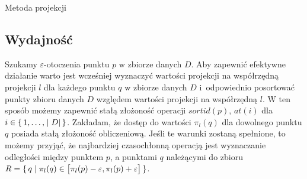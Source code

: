 \begin{algorithm}[t]
	\caption{Metoda projekcji}\label{alg:projection}
	
	\DontPrintSemicolon
	
	
	\setcounter{AlgoLine}{0}
	\nonl{}
	\setcounter{AlgoLine}{0}
	\nonl{}
	
	\setcounter{AlgoLine}{0}
	\nonl{}
	\nonl{}
\end{algorithm}

\subsection{Wydajność}
Szukamy $ \varepsilon $-otoczenia punktu $ p $ w zbiorze danych $ D $. Aby zapewnić efektywne działanie  warto jest wcześniej wyznaczyć wartości projekcji na współrzędną projekcji $ l $ dla każdego punktu $ q $ w zbiorze danych $ D $ \mbox{i odpowiednio} posortować punkty zbioru danych $ D $ względem wartości projekcji na współrzędną $ l $. W ten sposób możemy zapewnić stałą złożoność operacji $ sortid(p) $, $ at(i) $ dla $ i \in \set{1,\dots,|D|} $. Zakładam, że dostęp do wartości $ \pi_l(q) $ dla dowolnego punktu $ q $ posiada stałą złożoność obliczeniową. Jeśli te warunki zostaną spełnione, to możemy przyjąć, że najbardziej czasochłonną operacją  jest wyznaczanie odległości między punktem $ p $, a punktami $ q $ należącymi do zbioru \mbox{$ R = \set{q | \pi_l(q) \in \left[\pi_l(p)-\varepsilon,\pi_l(p)+\varepsilon\right]} $}.

